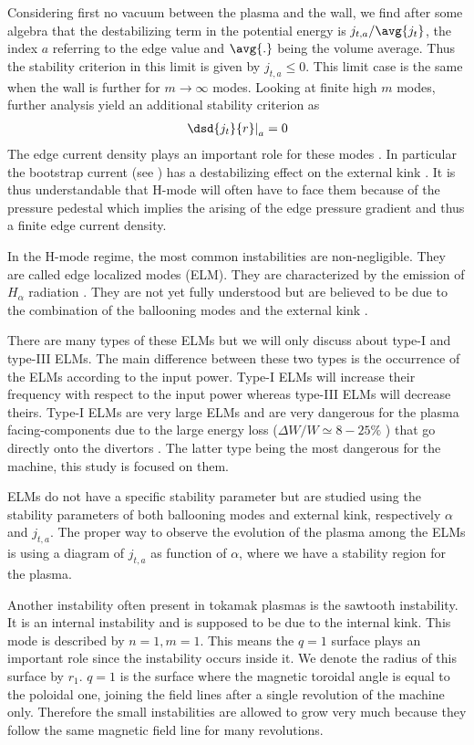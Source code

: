 Considering first no vacuum between the plasma and the wall, we find after some algebra that the destabilizing term in the potential energy is $j_{t,a} / \avg{j_t}$, the index $a$ referring to the edge value and $\avg{.}$ being the volume average. Thus the stability criterion in this limit is given by $j_{t,a} \le 0$. This limit case is the same when the wall is further for $m \rightarrow \infty$ modes. Looking at finite high $m$ modes, further analysis yield an additional stability criterion as
\begin{align*}
	\left. \dsd{j_t}{r} \right|_a = 0
\end{align*}
The edge current density plays an important role for these modes \cite{connor1998}. In particular the bootstrap current (see ) has a destabilizing effect on the external kink \cite{gimblett2006}. It is thus understandable that H-mode will often have to face them because of the pressure pedestal which implies the arising of the edge pressure gradient and thus a finite edge current density.

In the H-mode regime, the most common instabilities are non-negligible. They are called edge localized modes (ELM). They are characterized by the emission of $H_{\alpha}$ radiation \cite{wesson}. They are not yet fully understood but are believed to be due to the combination of the ballooning modes and the external kink \cite{loennroth2004}.

There are many types of these ELMs but we will only discuss about type-I and type-III ELMs. The main difference between these two types is the occurrence of the ELMs according to the input power. Type-I ELMs will increase their frequency with respect to the input power whereas type-III ELMs will decrease theirs. Type-I ELMs are very large ELMs and are very dangerous for the plasma facing-components due to the large energy loss ($\Delta W / W \simeq 8 - 25 \%$ \cite{andreas2010}) that go directly onto the divertors \cite{wesson}. The latter type being the most dangerous for the machine, this study is focused on them.

ELMs do not have a specific stability parameter but are studied using the stability parameters of both ballooning modes and external kink, respectively $\alpha$ and $j_{t,a}$. The proper way to observe the evolution of the plasma among the ELMs is using a diagram of $j_{t,a}$ as function of $\alpha$, where we have a stability region for the plasma.

Another instability often present in tokamak plasmas is the sawtooth instability. It is an internal instability and is supposed to be due to the internal kink. This mode is described by $n = 1, m = 1$. This means the $q = 1$ surface plays an important role since the instability occurs inside it. We denote the radius of this surface by $r_1$. $q = 1$ is the surface where the magnetic toroidal angle is equal to the poloidal one, joining the field lines after a single revolution of the machine only. Therefore the small instabilities are allowed to grow very much because they follow the same magnetic field line for many revolutions.

